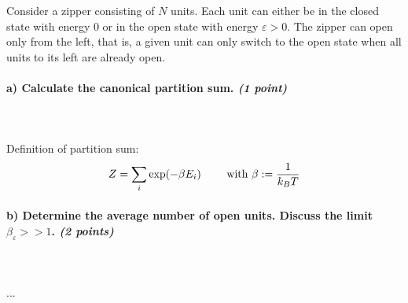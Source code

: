 Consider a zipper consisting of $N$ units. Each unit can either be in the 
closed state with energy 0 or in the open state with energy $\varepsilon>0$.
The zipper can open only from the left, that is, a given unit can only switch
to the open state when all units to its left are already open.

\paragraph{a) Calculate the canonical partition sum. \textit{(1 point)}} \ \\
    \\
    Definition of partition sum:
    \begin{equation}
        Z=\sum_i\exp(-\beta E_i)
        \ \ \ \ \ \ \ \textnormal{with }
        \beta:=\frac{1}{k_BT}
    \end{equation}

\paragraph{b) Determine the average number of open units. Discuss the limit 
    $\beta_\varepsilon>>1$. \textit{(2 points)}} \ \\
    \\
    ...
 
